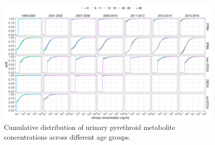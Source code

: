 \documentclass[toxics,article,submit,pdftex,moreauthors]{Definitions/mdpi}
\begin{document}
\begin{figure}[H]
\begin{adjustwidth}{-4cm}{}
\includegraphics[width=\linewidth]{figures/figa1}
\hfill
\end{adjustwidth}
\caption{Cumulative distribution of urinary pyrethroid metabolite concentrations across different age groups.}\label{fig:figa1}
\end{figure}
\end{document}

